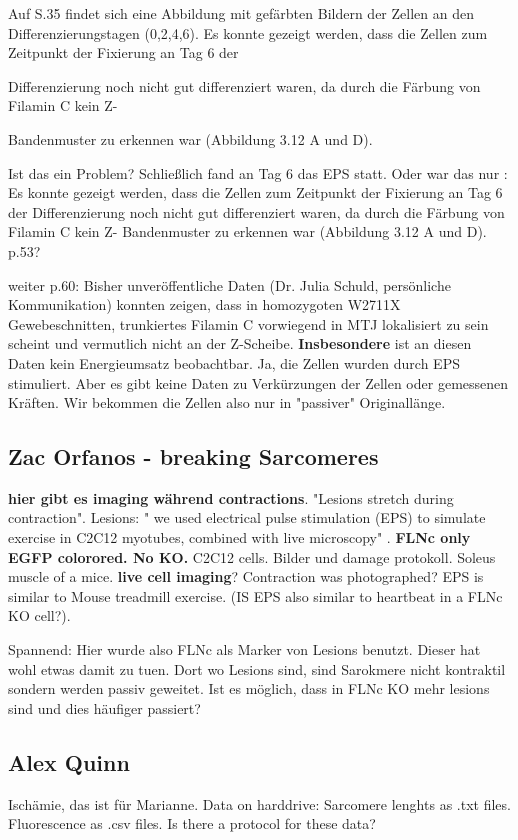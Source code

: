 Auf S.35 \cite{Unterbusch2017} findet sich eine Abbildung mit gefärbten Bildern der Zellen an den Differenzierungstagen (0,2,4,6).
Es konnte gezeigt werden, dass die Zellen zum Zeitpunkt der Fixierung an Tag 6 der

Differenzierung noch nicht gut differenziert waren, da durch die Färbung von Filamin C kein Z-

Bandenmuster zu erkennen war (Abbildung 3.12 A und D).

Ist das ein Problem? Schließlich fand an Tag 6 das EPS statt. Oder war das nur : Es konnte gezeigt werden, dass die Zellen zum Zeitpunkt der Fixierung an Tag 6 der
Differenzierung noch nicht gut differenziert waren, da durch die Färbung von Filamin C kein Z-
Bandenmuster zu erkennen war (Abbildung 3.12 A und D). p.53?

weiter p.60: Bisher unveröffentliche Daten (Dr. Julia
Schuld, persönliche Kommunikation) konnten zeigen, dass in homozygoten W2711X
Gewebeschnitten, trunkiertes Filamin C vorwiegend in MTJ lokalisiert zu sein scheint und
vermutlich nicht an der Z-Scheibe.
\textbf{Insbesondere} ist an diesen Daten kein Energieumsatz beobachtbar. Ja, die Zellen wurden durch EPS stimuliert. Aber es gibt keine Daten zu Verkürzungen der Zellen oder gemessenen Kräften. Wir bekommen die Zellen also nur in "passiver" Originallänge. 

\subsection*{Zac Orfanos - breaking Sarcomeres}
\textbf{hier gibt es imaging während contractions}. "Lesions stretch during contraction". Lesions: " we used electrical pulse stimulation (EPS) to simulate exercise in C2C12 myotubes, combined with live microscopy" \cite{orfanos2025}.
\textbf{FLNc only EGFP colorored. No KO.} C2C12 cells. Bilder und damage protokoll. Soleus muscle of a mice. \textbf{live cell imaging}? Contraction was photographed? EPS is similar to Mouse treadmill exercise. (IS EPS also similar to heartbeat in a FLNc KO cell?).

Spannend: Hier wurde also FLNc als Marker von Lesions benutzt. Dieser hat wohl etwas damit zu tuen. Dort wo Lesions sind, sind Sarokmere nicht kontraktil sondern werden passiv geweitet. Ist es möglich, dass in FLNc KO mehr lesions sind und dies häufiger passiert?

\subsection*{Alex Quinn}
Ischämie, das ist für Marianne.
Data on harddrive: Sarcomere lenghts as .txt files. \newline 
Fluorescence as .csv files.
Is there a protocol for these data?




